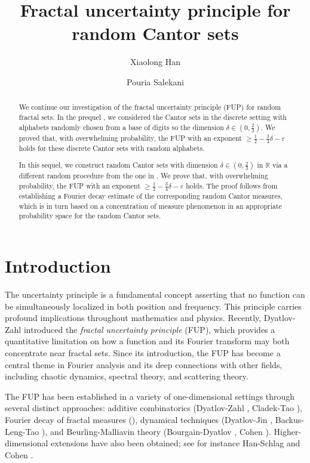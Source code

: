 \documentclass[12pt,reqno]{amsart}
\title{Fractal uncertainty principle for random Cantor sets}
\author{Xiaolong Han}
\author{Pouria Salekani}
\newcommand\R{\mathbb{R}}
\newcommand\ve{\varepsilon}
\theoremstyle{plain}
\theoremstyle{remark}
\numberwithin{equation}{section}
\begin{document}
\maketitle


\begin{abstract}
We continue our investigation of the fractal uncertainty principle (FUP) for random fractal sets. In the prequel \cite{EH}, we considered the Cantor sets in the discrete setting with alphabets randomly chosen from a base of digits so the dimension $\delta\in(0,\frac23)$. We proved that, with overwhelming probability, the FUP with an exponent $\ge\frac12-\frac34\delta-\ve$ holds for these discrete Cantor sets with random alphabets.

In this sequel, we construct random Cantor sets with dimension $\delta\in(0,\frac23)$ in $\R$ via a different random procedure from the one in \cite{EH}. We prove that, with overwhelming probability, the FUP with an exponent $\ge\frac12-\frac34\delta-\ve$ holds. The proof follows from establishing a Fourier decay estimate of the corresponding random Cantor measures, which is in turn based on a concentration of measure phenomenon in an appropriate probability space for the random Cantor sets.
\end{abstract}


\section{Introduction}\label{sec:intro}
The uncertainty principle is a fundamental concept asserting that no function can be simultaneously localized in both position and frequency. This principle carries profound implications throughout mathematics and physics. Recently, Dyatlov-Zahl \cite{DZ} introduced the \textit{fractal uncertainty principle} (FUP), which provides a quantitative limitation on how a function and its Fourier transform may both concentrate near fractal sets. Since its introduction, the FUP has become a central theme in Fourier analysis and its deep connections with other fields, including chaotic dynamics, spectral theory, and scattering theory.

The FUP has been established in a variety of one-dimensional settings through several distinct approaches: additive combinatorics (Dyatlov-Zahl \cite{DZ}, Cladek-Tao \cite{CT}), Fourier decay of fractal measures (\cite{BD1}), dynamical techniques (Dyatlov-Jin \cite{DJ2}, Backus-Leng-Tao \cite{BLT}), and Beurling-Malliavin theory (Bourgain-Dyatlov \cite{BD2}, Cohen \cite{C2}). Higher-dimensional extensions have also been obtained; see for instance Han-Schlag \cite{HS} and Cohen \cite{C1, C2}.
\end{document}
